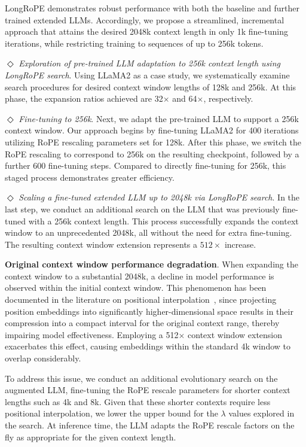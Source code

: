 LongRoPE demonstrates robust performance with both the baseline and further trained extended LLMs. Accordingly, we propose a streamlined, incremental approach that attains the desired 2048k context length in only 1k fine-tuning iterations, while restricting training to sequences of up to 256k tokens.

$\Diamond$ \textit{Exploration of pre-trained LLM adaptation to 256k context length using LongRoPE search}. Using LLaMA2 as a case study, we systematically examine search procedures for desired context window lengths of 128k and 256k. At this phase, the expansion ratios achieved are 32$\times$ and 64$\times$, respectively.

$\Diamond$ \textit{Fine-tuning to 256k}. Next, we adapt the pre-trained LLM to support a 256k context window. Our approach begins by fine-tuning LLaMA2 for 400 iterations utilizing RoPE rescaling parameters set for 128k. After this phase, we switch the RoPE rescaling to correspond to 256k on the resulting checkpoint, followed by a further 600 fine-tuning steps. Compared to directly fine-tuning for 256k, this staged process demonstrates greater efficiency.

$\Diamond$ \textit{Scaling a fine-tuned extended LLM up to 2048k via LongRoPE search}. In the last step, we conduct an additional search on the LLM that was previously fine-tuned with a 256k context length. This process successfully expands the context window to an unprecedented 2048k, all without the need for extra fine-tuning. The resulting context window extension represents a $512\times$ increase.

\textbf{Original context window performance degradation}.  When expanding the context window to a substantial 2048k, a decline in model performance is observed within the initial context window. This phenomenon has been documented in the literature on positional interpolation~\cite{pi}, since projecting position embeddings into significantly higher-dimensional space results in their compression into a compact interval for the original context range, thereby impairing model effectiveness. Employing a 512$\times$ context window extension exacerbates this effect, causing embeddings within the standard 4k window to overlap considerably.

To address this issue, we conduct an additional evolutionary search on the augmented LLM, fine-tuning the RoPE rescale parameters for shorter context lengths such as 4k and 8k. Given that these shorter contexts require less positional interpolation, we lower the upper bound for the $\lambda$ values explored in the search. At inference time, the LLM adapts the RoPE rescale factors on the fly as appropriate for the given context length.

